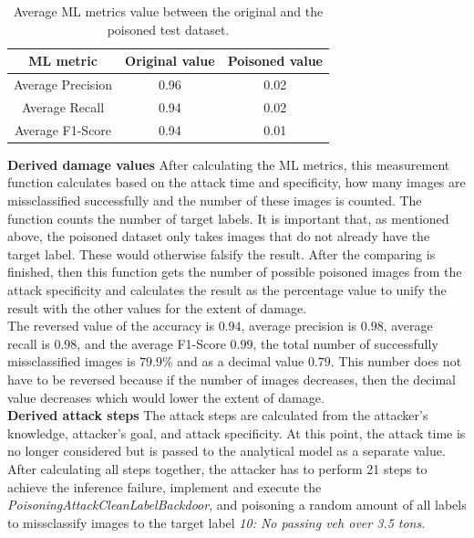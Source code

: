\begin{table}[ht!]
  \centering
  \begin{tabular}{| c | c | c |}
  \hline
  \rowcolor{lightgray} ML metric & Original value & Poisoned value \\ [0.5ex]
  \hline
  Average Precision & 0.96 & 0.02 \\
  \hline
  Average Recall & 0.94 & 0.02 \\
  \hline
  Average F1-Score & 0.94 & 0.01 \\
  \hline
  \end{tabular}
  \caption{Average ML metrics value between the original and the poisoned test dataset.}
  \label{tab:ml_metrics}
\end{table}

\noindent\textbf{Derived damage values} After calculating the ML metrics, this measurement function calculates based on the attack time and specificity, how many images are missclassified successfully and the number of these images is counted. The function counts the number of target labels. It is important that, as mentioned above, the poisoned dataset only takes images that do not already have the target label. These would otherwise falsify the result. After the comparing is finished, then this function gets the number of possible poisoned images from the attack specificity and calculates the result as the percentage value to unify the result with the other values for the extent of damage. \\
The reversed value of the accuracy is $0.94$, average precision is $0.98$, average recall is $0.98$, and the average F1-Score $0.99$, the total number of successfully missclassified images is $79.9\%$ and as a decimal value $0.79$. This number does not have to be reversed because if the number of images decreases, then the decimal value decreases which would lower the extent of damage. \\

\noindent\textbf{Derived attack steps} The attack steps are calculated from the attacker's knowledge, attacker's goal, and attack specificity. At this point, the attack time is no longer considered but is passed to the analytical model as a separate value. \\
After calculating all steps together, the attacker has to perform 21 steps to achieve the inference failure, implement and execute the \textit{PoisoningAttackCleanLabelBackdoor}, and poisoning a random amount of all labels to missclassify images to the target label \textit{10: No passing veh over 3.5 tons}. \\

